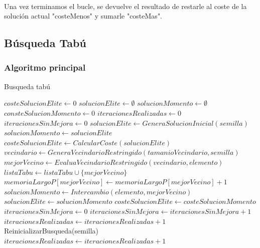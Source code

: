 \documentclass{article}
\begin{document}
	\paragraph{}Una vez terminamos el bucle, se devuelve el resultado de restarle al coste de la solución actual "costeMenos" y sumarle "costeMas".
	
	\subsection{Búsqueda Tabú}
	
		\subsubsection{Algoritmo principal}
	
		\begin{algorithm}[H]
			\caption{Busqueda tabú}
			\begin{algorithmic}
				\STATE $costeSolucionElite \leftarrow 0$
				\STATE $solucionElite \leftarrow \emptyset$
				\STATE $solucionMomento \leftarrow \emptyset$
				\STATE $consteSolucionMomento \leftarrow 0$
				\STATE $iteracionesRealizadas \leftarrow 0$
				\STATE $iteracionesSinMejora \leftarrow 0$
				\STATE $solucionElite \leftarrow GeneraSolucionInicial(semilla)$
				\STATE $solucionMomento \leftarrow solucionElite$
				\STATE $costeSolucionElite \leftarrow CalcularCoste(solucionElite)$
				\STATE $vecindario \leftarrow GeneraVecindarioRestringido(tamanioVecindario,semilla)$
				\STATE $mejorVecino \leftarrow EvaluaVecindarioRestringido(vecindario,elemento)$
				\ENDFOR
				\STATE $listaTabu \leftarrow listaTabu \cup \{mejorVecino\}$
				\STATE $memoriaLargoP[mejorVecino] \leftarrow memoriaLargoP[mejorVecino]+1$
				\STATE $solucionMomento \leftarrow Intercambio(elemento, mejorVecino)$
				\STATE $solucionElite \leftarrow solucionMomento$
				\STATE $costeSolucionElite \leftarrow costeSolucionMomento$
				\STATE $iteracionesSinMejora \leftarrow 0$
				\ELSE
				\STATE $iteracionesSinMejora \leftarrow iteracionesSinMejora+1$
				\ENDIF
				\STATE $iteracionesRealizadas \leftarrow iteracionesRealizadas+1$
				\STATE ReinicializarBusqueda(semilla)
				\STATE $iteracionesRealizadas \leftarrow iteracionesRealizadas+1$
				\ENDIF
				\ENDWHILE
			\end{algorithmic}
		\end{algorithm}
		
\end{document}
